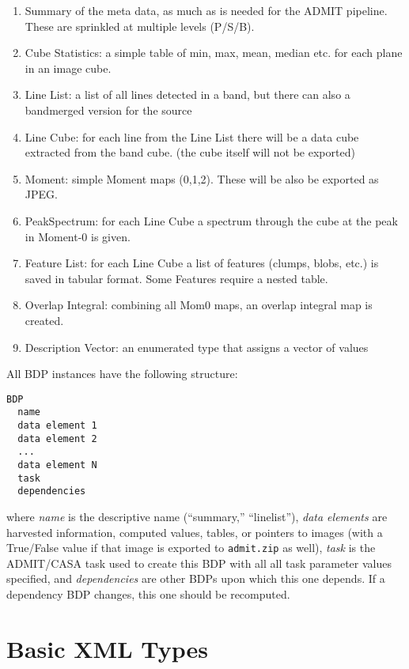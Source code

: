 \documentclass{article}
\begin{document}
\begin{enumerate}
\item
Summary of the meta data, as much as is needed for the ADMIT pipeline. These
are sprinkled at multiple levels (P/S/B).
\item
Cube Statistics: a simple table of min, max, mean, median etc. for each plane in
an image cube.
\item
Line List: a list of all lines detected in a band, but there can also a 
bandmerged version for the source
\item
Line Cube: for each line from the Line List there will be a data cube extracted from the
band cube.  (the cube itself will not be exported)
\item
Moment: simple Moment maps (0,1,2). These will be also be exported as JPEG.
\item
PeakSpectrum: for each Line Cube a spectrum through the cube at the peak in Moment-0 is given.
\item
Feature List: for each Line Cube a list of features (clumps, blobs, etc.) is saved in tabular format.
Some Features require a nested table. 
\item 
Overlap Integral: combining all Mom0 maps, an overlap integral map is created.
\item
Description Vector: an enumerated type that assigns a vector of values 
\end{enumerate}

\noindent All BDP instances have the following structure:

\begin{verbatim}
BDP
  name 
  data element 1
  data element 2
  ...
  data element N
  task
  dependencies
\end{verbatim}

\noindent where {\it name} is the descriptive name (``summary,''
``linelist''), {\it data elements} are harvested information, computed 
values, tables, or pointers to images (with a True/False value if that
image is exported to {\tt admit.zip} as well),
{\it task} is the ADMIT/CASA 
task used to create this BDP with all all task parameter values specified,
and {\it dependencies} are other BDPs upon which this one depends. 
If a dependency BDP changes, this one should be recomputed.


\section{Basic XML Types}
\end{document}
